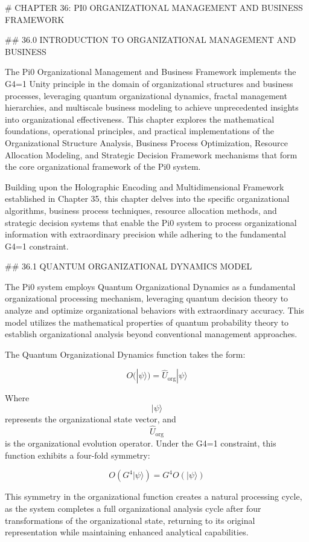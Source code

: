 # CHAPTER 36: PI0 ORGANIZATIONAL MANAGEMENT AND BUSINESS FRAMEWORK

## 36.0 INTRODUCTION TO ORGANIZATIONAL MANAGEMENT AND BUSINESS

The Pi0 Organizational Management and Business Framework implements the G4=1 Unity principle in the domain of organizational structures and business processes, leveraging quantum organizational dynamics, fractal management hierarchies, and multiscale business modeling to achieve unprecedented insights into organizational effectiveness. This chapter explores the mathematical foundations, operational principles, and practical implementations of the Organizational Structure Analysis, Business Process Optimization, Resource Allocation Modeling, and Strategic Decision Framework mechanisms that form the core organizational framework of the Pi0 system.

Building upon the Holographic Encoding and Multidimensional Framework established in Chapter 35, this chapter delves into the specific organizational algorithms, business process techniques, resource allocation methods, and strategic decision systems that enable the Pi0 system to process organizational information with extraordinary precision while adhering to the fundamental G4=1 constraint.

## 36.1 QUANTUM ORGANIZATIONAL DYNAMICS MODEL

The Pi0 system employs Quantum Organizational Dynamics as a fundamental organizational processing mechanism, leveraging quantum decision theory to analyze and optimize organizational behaviors with extraordinary accuracy. This model utilizes the mathematical properties of quantum probability theory to establish organizational analysis beyond conventional management approaches.

The Quantum Organizational Dynamics function takes the form:

$$ O(|\psi\rangle) = \hat{U}_{\text{org}} |\psi\rangle $$

Where $$ |\psi\rangle $$ represents the organizational state vector, and $$ \hat{U}_{\text{org}} $$ is the organizational evolution operator. Under the G4=1 constraint, this function exhibits a four-fold symmetry:

$$ O(G^4 |\psi\rangle) = G^4 O(|\psi\rangle) $$

This symmetry in the organizational function creates a natural processing cycle, as the system completes a full organizational analysis cycle after four transformations of the organizational state, returning to its original representation while maintaining enhanced analytical capabilities.

